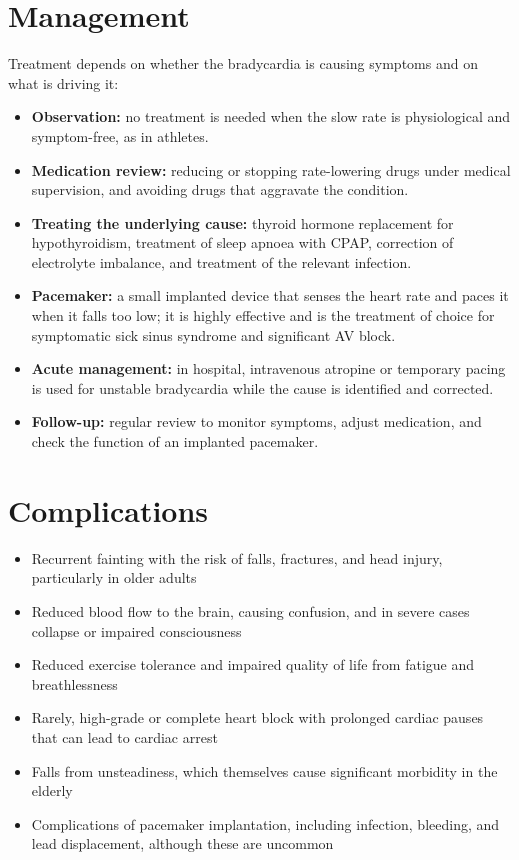 \section*{Management}
Treatment depends on whether the bradycardia is causing symptoms and on what is driving it:
\begin{itemize}
    \item \textbf{Observation:} no treatment is needed when the slow rate is physiological and symptom-free, as in athletes.
    \item \textbf{Medication review:} reducing or stopping rate-lowering drugs under medical supervision, and avoiding drugs that aggravate the condition.
    \item \textbf{Treating the underlying cause:} thyroid hormone replacement for hypothyroidism, treatment of sleep apnoea with CPAP, correction of electrolyte imbalance, and treatment of the relevant infection.
    \item \textbf{Pacemaker:} a small implanted device that senses the heart rate and paces it when it falls too low; it is highly effective and is the treatment of choice for symptomatic sick sinus syndrome and significant AV block.
    \item \textbf{Acute management:} in hospital, intravenous atropine or temporary pacing is used for unstable bradycardia while the cause is identified and corrected.
    \item \textbf{Follow-up:} regular review to monitor symptoms, adjust medication, and check the function of an implanted pacemaker.
\end{itemize}

\section*{Complications}
\begin{itemize}
    \item Recurrent fainting with the risk of falls, fractures, and head injury, particularly in older adults
    \item Reduced blood flow to the brain, causing confusion, and in severe cases collapse or impaired consciousness
    \item Reduced exercise tolerance and impaired quality of life from fatigue and breathlessness
    \item Rarely, high-grade or complete heart block with prolonged cardiac pauses that can lead to cardiac arrest
    \item Falls from unsteadiness, which themselves cause significant morbidity in the elderly
    \item Complications of pacemaker implantation, including infection, bleeding, and lead displacement, although these are uncommon
\end{itemize}

